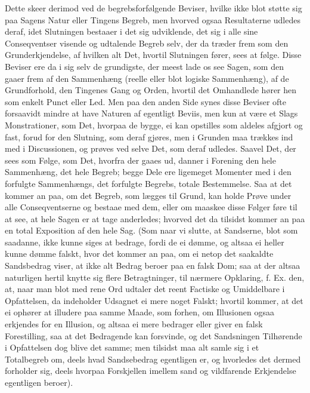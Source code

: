 \documentclass[12pt]{book}
\def\textit#1{#1}%
\newcommand{\opage}[1]{\marginnote{\footnotesize\textit{[#1]}}}
\begin{document}
Dette skeer derimod ved de begrebsforfølgende Beviser, hvilke ikke blot støtte
sig paa Sagens Natur eller Tingens Begreb, men hvorved ogsaa Resultaterne
udledes deraf, idet Slutningen bestaaer i det sig udviklende, det sig i alle
sine Conseqventser visende og udtalende Begreb selv, der da træder frem som den
Grunderkjendelse, af hvilken alt Det, hvortil Slutningen fører, sees at følge.
Disse Beviser ere da i sig selv de grundigste, der meest lade os see Sagen, som
den gaaer frem af den Sammenhæng (reelle eller blot logiske Sammenhæng), af de
Grundforhold, den Tingenes Gang og Orden, hvortil det Omhandlede hører hen som
enkelt Punct eller Led. Men paa den anden Side synes disse Beviser ofte
forsaavidt mindre at have Naturen af egentligt Beviis, men kun at være et Slags
Monstrationer, som Det, hvorpaa de bygge, ei kan opstilles som aldeles afgjort
og fast, forud for den Slutning, som deraf gjøres, men i Grunden maa trækkes ind
med i Discussionen, og prøves ved selve Det, som deraf udledes. Saavel Det, der
sees som Følge, som Det, hvorfra der gaaes ud, danner i Forening den hele
Sammenhæng, det hele Begreb; begge Dele ere ligemeget Momenter med i den
forfulgte Sammenhængs, det forfulgte Begrebs, totale Bestemmelse. Saa at det
kommer an paa, om
\opage{358} det Begreb, som lægges til Grund, kan holde Prøve under alle Conseqventserne og
bestaae med dem, eller om maaskee disse Følger føre til at see, at hele Sagen er
at tage anderledes; hvorved det da tilsidst kommer an paa en total Exposition af
den hele Sag. (Som naar vi slutte, at Sandserne, blot som saadanne, ikke kunne
siges at bedrage, fordi de ei dømme, og altsaa ei heller kunne dømme falskt,
hvor det kommer an paa, om ei netop det saakaldte Sandsbedrag viser, at ikke alt
Bedrag beroer paa en falsk Dom; saa at der altsaa naturligen hertil knytte sig
flere Betragtninger, til nærmere Opklaring, f. Ex. den, at, naar man blot med
rene Ord udtaler det reent Factiske og Umiddelbare i Opfattelsen, da indeholder
Udsagnet ei mere noget Falskt; hvortil kommer, at det ei ophører at illudere paa
samme Maade, som forhen, om Illusionen ogsaa erkjendes for en Illusion, og
altsaa ei mere bedrager eller giver en falsk Forestilling, saa at det Bedragende
kan forsvinde, og det Sandsningen Tilhørende i Opfattelsen dog blive det samme;
men tilsidst maa alt samle sig i et Totalbegreb om, deels hvad Sandsebedrag
egentligen er, og hvorledes det dermed forholder sig, deels hvorpaa Forskjellen
imellem sand og vildfarende Erkjendelse egentligen beroer).
\end{document}
